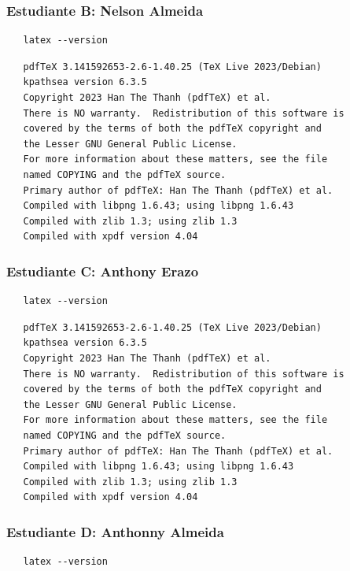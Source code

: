 \documentclass{article}
\begin{document}
\subsubsection{Estudiante B: Nelson Almeida}
\label{sec:orgadc6543}

\begin{verbatim}
   latex --version
\end{verbatim}

\begin{verbatim}
   pdfTeX 3.141592653-2.6-1.40.25 (TeX Live 2023/Debian)
   kpathsea version 6.3.5
   Copyright 2023 Han The Thanh (pdfTeX) et al.
   There is NO warranty.  Redistribution of this software is
   covered by the terms of both the pdfTeX copyright and
   the Lesser GNU General Public License.
   For more information about these matters, see the file
   named COPYING and the pdfTeX source.
   Primary author of pdfTeX: Han The Thanh (pdfTeX) et al.
   Compiled with libpng 1.6.43; using libpng 1.6.43
   Compiled with zlib 1.3; using zlib 1.3
   Compiled with xpdf version 4.04
\end{verbatim}
\subsubsection{Estudiante C: Anthony Erazo}
\label{sec:org2385142}
\begin{verbatim}
   latex --version
\end{verbatim}

\begin{verbatim}
   pdfTeX 3.141592653-2.6-1.40.25 (TeX Live 2023/Debian)
   kpathsea version 6.3.5
   Copyright 2023 Han The Thanh (pdfTeX) et al.
   There is NO warranty.  Redistribution of this software is
   covered by the terms of both the pdfTeX copyright and
   the Lesser GNU General Public License.
   For more information about these matters, see the file
   named COPYING and the pdfTeX source.
   Primary author of pdfTeX: Han The Thanh (pdfTeX) et al.
   Compiled with libpng 1.6.43; using libpng 1.6.43
   Compiled with zlib 1.3; using zlib 1.3
   Compiled with xpdf version 4.04
\end{verbatim}

\subsubsection{Estudiante D: Anthonny Almeida}
\label{sec:orgfeafc38}

\begin{verbatim}
   latex --version
\end{verbatim}
\end{document}
